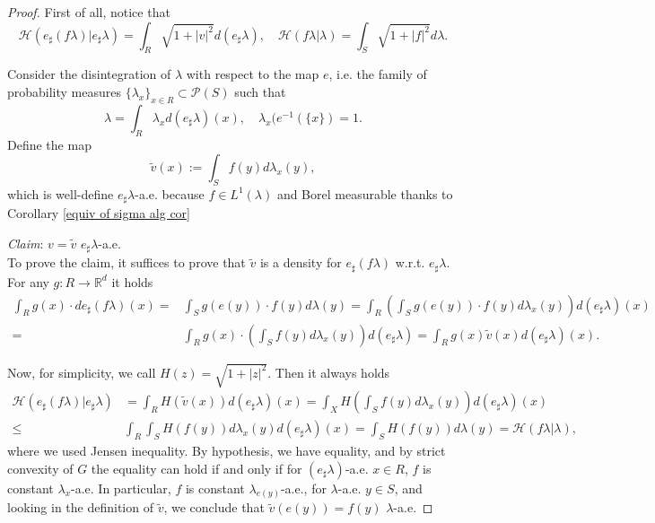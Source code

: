 \documentclass[10pt,leqno]{amsart}
\numberwithin{equation}{section}
\newcommand{\R}{\mathbb{R}}
\begin{document}
\begin{proof}
    First of all, notice that 
    \[\mathcal{H}\left( e_\sharp (f\lambda) | e_\sharp \lambda \right) = \int_R \sqrt{1+|v|^2} d(e_\sharp \lambda), \quad \mathcal{H}\left( f\lambda | \lambda \right) = \int_S \sqrt{1+|f|^2} d\lambda.\]

    Consider the disintegration of $\lambda$ with respect to the map $e$, i.e. the family of probability measures $\{\lambda_x\}_{x\in R}\subset \mathcal{P}(S)$ such that 
    \[\lambda = \int_R \lambda_x d(e_\sharp \lambda)(x), \quad \lambda_x(e^{-1}(\{x\}) = 1.\]
    Define the map 
    \[\tilde{v}(x) := \int_{S} f(y) d\lambda_x(y),\]
    which is well-define $e_\sharp \lambda$-a.e. because $f\in L^1(\lambda)$ and Borel measurable thanks to Corollary \ref{equiv of sigma alg cor}

    \textit{Claim}: $v=\tilde{v}$ $e_\sharp \lambda$-a.e. 
    \\
    To prove the claim, it suffices to prove that $\tilde{v}$ is a density for $e_\sharp (f\lambda)$ w.r.t. $e_\sharp \lambda$. For any $g:R\to \R^d$ it holds
    \begin{align*}
        \int_R g(x) \cdot de_{\sharp }(f\lambda)(x) = & \int_S g(e(y)) \cdot f(y) d\lambda(y) 
        = 
        \int_R \left( \int_S g(e(y))\cdot f(y) d\lambda_x(y) \right) d(e_\sharp \lambda)(x)
        \\
        = & 
        \int_R g(x) \cdot \left( 
        \int_S f(y) d\lambda_x(y) \right)d(e_\sharp \lambda) 
        = 
        \int_R g(x) \tilde{v}(x) d(e_\sharp \lambda)(x).
    \end{align*}
    
    Now, for simplicity, we call $H(z) = \sqrt{1+|z|^2}$. Then it always holds
    \begin{align*}
        \mathcal{H}\left( e_\sharp (f\lambda) | e_\sharp \lambda \right) & =  \int_R H(\tilde{v}(x)) d(e_\sharp \lambda)(x) = \int_X H\left( \int_S f(y) d\lambda_x(y) \right) d(e_\sharp \lambda)(x)
        \\
        \leq & \int_R \int_S H(f(y)) d\lambda_x(y) d(e_\sharp \lambda)(x) = \int_S H(f(y)) d\lambda(y) = \mathcal{H}\left(f\lambda |\lambda \right),
    \end{align*}
    where we used Jensen inequality. By hypothesis, we have equality, and by strict convexity of $G$ the equality can hold if and only if for $(e_\sharp \lambda)$-a.e. $x\in R$, $f$ is constant $\lambda_x$-a.e. In particular, $f$ is constant $\lambda_{e(y)}$-a.e., for $\lambda$-a.e. $y\in S$, and looking in the definition of $\tilde{v}$, we conclude that $\tilde{v}(e(y)) = f(y)$ $\lambda$-a.e.
\end{proof}
\end{document}
